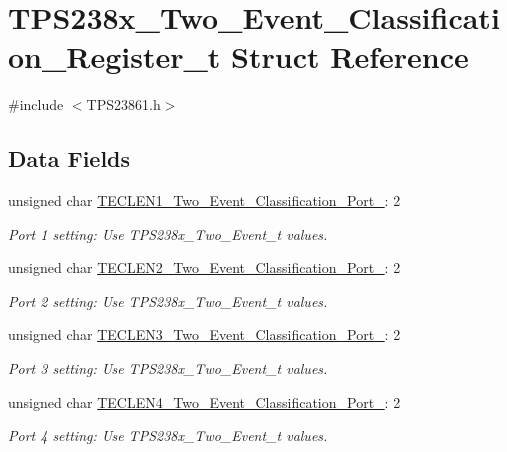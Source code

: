 \hypertarget{struct_t_p_s238x___two___event___classification___register__t}{\section{T\-P\-S238x\-\_\-\-Two\-\_\-\-Event\-\_\-\-Classification\-\_\-\-Register\-\_\-t Struct Reference}
\label{struct_t_p_s238x___two___event___classification___register__t}
}


{\ttfamily \#include $<$T\-P\-S23861.\-h$>$}

\subsection*{Data Fields}
\begin{DoxyCompactItemize}
\item 
unsigned char \hyperlink{struct_t_p_s238x___two___event___classification___register__t_a598efe8308a7a06573ecb8e43b5eed03}{T\-E\-C\-L\-E\-N1\-\_\-\-Two\-\_\-\-Event\-\_\-\-Classification\-\_\-\-Port\-\_}\-: 2
\begin{DoxyCompactList}\small\item\em Port 1 setting\-: Use T\-P\-S238x\-\_\-\-Two\-\_\-\-Event\-\_\-t values. \end{DoxyCompactList}\item 
unsigned char \hyperlink{struct_t_p_s238x___two___event___classification___register__t_a8b559276e8781cadd184cc28cb62945b}{T\-E\-C\-L\-E\-N2\-\_\-\-Two\-\_\-\-Event\-\_\-\-Classification\-\_\-\-Port\-\_}\-: 2
\begin{DoxyCompactList}\small\item\em Port 2 setting\-: Use T\-P\-S238x\-\_\-\-Two\-\_\-\-Event\-\_\-t values. \end{DoxyCompactList}\item 
unsigned char \hyperlink{struct_t_p_s238x___two___event___classification___register__t_a8dc2b50e6ee19d98b1b7ea5433684c1b}{T\-E\-C\-L\-E\-N3\-\_\-\-Two\-\_\-\-Event\-\_\-\-Classification\-\_\-\-Port\-\_}\-: 2
\begin{DoxyCompactList}\small\item\em Port 3 setting\-: Use T\-P\-S238x\-\_\-\-Two\-\_\-\-Event\-\_\-t values. \end{DoxyCompactList}\item 
unsigned char \hyperlink{struct_t_p_s238x___two___event___classification___register__t_aa4565fc4362532812b6299028bffea75}{T\-E\-C\-L\-E\-N4\-\_\-\-Two\-\_\-\-Event\-\_\-\-Classification\-\_\-\-Port\-\_}\-: 2
\begin{DoxyCompactList}\small\item\em Port 4 setting\-: Use T\-P\-S238x\-\_\-\-Two\-\_\-\-Event\-\_\-t values. \end{DoxyCompactList}\end{DoxyCompactItemize}


